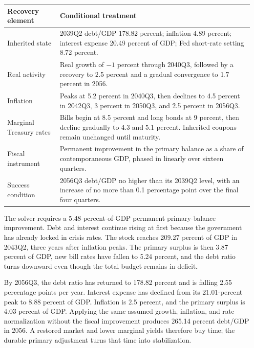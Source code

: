 \documentclass[11pt]{article}
\begin{document}
\begin{center}
\small
\setlength{\tabcolsep}{5pt}
\renewcommand{\arraystretch}{1.08}
\begin{tabularx}{\textwidth}{p{}Y}
\toprule
Recovery element & Conditional treatment \\
\midrule
Inherited state & 2039Q2 debt/GDP 178.82 percent; inflation 4.89 percent; interest expense
20.49 percent of GDP; Fed short-rate setting 8.72 percent. \\
\addlinespace
Real activity & Real growth of $-1$ percent through 2040Q3, followed by a recovery to 2.5
percent and a gradual convergence to 1.7 percent in 2056. \\
\addlinespace
Inflation & Peaks at 5.2 percent in 2040Q3, then declines to 4.5 percent in 2042Q3,
3 percent in 2050Q3, and 2.5 percent in 2056Q3. \\
\addlinespace
Marginal Treasury rates & Bills begin at 8.5 percent and long bonds at 9 percent, then
decline gradually to 4.3 and 5.1 percent.  Inherited coupons remain unchanged until maturity. \\
\addlinespace
Fiscal instrument & Permanent improvement in the primary balance as a share of contemporaneous
GDP, phased in linearly over sixteen quarters. \\
\addlinespace
Success condition & 2056Q3 debt/GDP no higher than its 2039Q2 level, with an increase of no
more than 0.1 percentage point over the final four quarters. \\
\bottomrule
\end{tabularx}
\end{center}

The solver requires a 5.48-percent-of-GDP permanent primary-balance improvement.  Debt and
interest continue rising at first because the government has already locked in crisis rates.
The stock reaches 209.27 percent of GDP in 2043Q2, three years after inflation peaks.  The
primary surplus is then 3.87 percent of GDP, new bill rates have fallen to 5.24 percent, and
the debt ratio turns downward even though the total budget remains in deficit.

By 2056Q3, the debt ratio has returned to 178.82 percent and is falling 2.55 percentage points
per year.  Interest expense has declined from its 21.01-percent peak to 8.88 percent of GDP.
Inflation is 2.5 percent, and the primary surplus is 4.03 percent of GDP.  Applying the same
assumed growth, inflation, and rate normalization without the fiscal improvement produces
265.14 percent debt/GDP in 2056.  A restored market and lower marginal yields therefore buy
time; the durable primary adjustment turns that time into stabilization.
\end{document}
